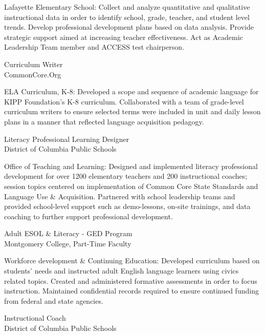 \documentclass[]{scrartcl}
\begin{document}
\begin{cleanCV}
\JobDesc
{Lafayette Elementary School: }
{Collect and analyze quantitative and qualitative instructional data in order to identify school, grade, teacher, and student level trends. Develop professional development plans based on data analysis. Provide strategic support aimed at increasing teacher effectiveness. Act as Academic Leadership Team member and ACCESS test chairperson.}

{Curriculum Writer}
{\\CommonCore.Org}

\JobDesc
{ELA Curriculum, K-8: }
{Developed a scope and sequence of academic language for KIPP Foundation's K-8 curriculum. Collaborated with a team of grade-level curriculum writers to ensure selected terms were included in unit and daily lesson plans in a manner that reflected language acquisition pedagogy.}

{Literacy Professional Learning Designer}
{\\District of Columbia Public Schools}

\JobDesc
{Office of Teaching and Learning: }
{Designed and implemented literacy professional development for over 1200 elementary teachers and 200 instructional coaches; session topics centered on implementation of Common Core State Standards and Language Use \& Acquisition. Partnered with school leadership teams and provided school-level support such as demo-lessons, on-site trainings, and data coaching to further support professional development.}



{Adult ESOL \& Literacy - GED Program}
{\\Montgomery College, Part-Time Faculty}

\JobDesc
{Workforce development \& Continuing Education: }
{Developed curriculum based on students' needs and instructed adult English language learners using civics related topics. Created and administered formative assessments in order to focus instruction. Maintained confidential records required to ensure continued funding from federal and state agencies.}


{Instructional Coach}
{\\District of Columbia Public Schools}


\end{cleanCV}
\end{document}
